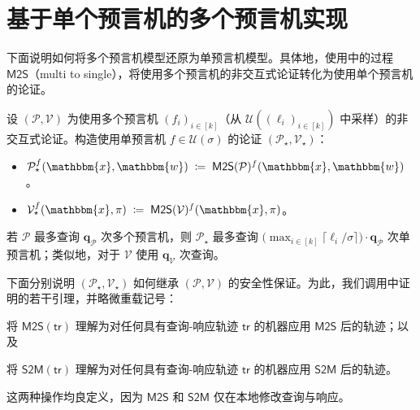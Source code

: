 \documentclass[american,singlepageview]{snargs-book-zh}
\newcommand{\DefineEqual}{\coloneqq}
\newcommand{\Instance}{\mathbbm{x}}
\newcommand{\Witness}{\mathbbm{w}}
\newcommand{\ProtoProver}{P}
\newcommand{\ProtoVerifier}{V}
\newcommand{\ARGFormat}[1]{\mathcal{#1}}
\newcommand{\ARGProver}{\ARGFormat{\ProtoProver}}
\newcommand{\ARGVerifier}{\ARGFormat{\ProtoVerifier}}
\newcommand{\ARGString}{\pi}
\newcommand{\ARGComplexityFormat}[1]{\mathbf{#1}}
\newcommand{\ARGQueryP}{\ARGComplexityFormat{q}_{\scriptscriptstyle\ARGProver}}
\newcommand{\ARGQueryV}{\ARGComplexityFormat{q}_{\scriptscriptstyle\ARGVerifier}}
\newcommand{\ROFunction}{f}
\newcommand{\RODistribution}[1]{\mathcal{U}(#1)}
\newcommand{\ROVectorLength}{k}
\newcommand{\ROTrace}{\mathsf{tr}}
\newcommand{\ROOutputSize}{\sigma}
\newcommand{\ROChosenOutputSize}{\ell}
\newcommand{\MultiToSingle}{\mathsf{M2S}}
\newcommand{\SingleToMulti}{\mathsf{S2M}}
\begin{document}
\section{基于单个预言机的多个预言机实现}
\label{section:narg-multiple-oracles-from-single-oracle}

下面说明如何将多个预言机模型还原为单预言机模型。具体地，使用中的过程 $\MultiToSingle$（multi to single），将使用多个预言机的非交互式论证转化为使用单个预言机的论证。

\begin{construction}
\label{construction:arg-multi-to-single-oracle}
设 $(\ARGProver,\ARGVerifier)$ 为使用多个预言机 $(\ROFunction_{i})_{i\in[\ROVectorLength]}$（从 $\RODistribution{(\ROChosenOutputSize_{i})_{i\in[\ROVectorLength]}}$ 中采样）的非交互式论证。构造使用单预言机 $\ROFunction\in\RODistribution{\ROOutputSize}$ 的论证 $(\ARGProver_{\star},\ARGVerifier_{\star})$：
\begin{itemize}[noitemsep]
  \item $\ARGProver_{\star}^{\ROFunction}(\Instance,\Witness)\;\DefineEqual\;\MultiToSingle(\ARGProver)^{\ROFunction}(\Instance,\Witness)$。
  \item $\ARGVerifier_{\star}^{\ROFunction}(\Instance,\ARGString)\;\DefineEqual\;\MultiToSingle(\ARGVerifier)^{\ROFunction}(\Instance,\ARGString)$。
\end{itemize}
若 $\ARGProver$ 最多查询 $\ARGQueryP$ 次多个预言机，则 $\ARGProver_{\star}$ 最多查询
\(
  \bigl(\max_{i\in[\ROVectorLength]}\lceil\ROChosenOutputSize_{i}/\ROOutputSize\rceil\bigr)
  \cdot\ARGQueryP
\)
次单预言机；类似地，对于 $\ARGVerifier$ 使用 $\ARGQueryV$ 次查询。
\end{construction}

下面分别说明 $(\ARGProver_{\star},\ARGVerifier_{\star})$ 如何继承 $(\ARGProver,\ARGVerifier)$ 的安全性保证。为此，我们调用中证明的若干引理，并略微重载记号：
\begin{inparaenum}[(a)]
  \item 将 $\MultiToSingle(\ROTrace)$ 理解为对任何具有查询-响应轨迹 $\ROTrace$ 的机器应用 $\MultiToSingle$ 后的轨迹；以及
  \item 将 $\SingleToMulti(\ROTrace)$ 理解为对任何具有查询-响应轨迹 $\ROTrace$ 的机器应用 $\SingleToMulti$ 后的轨迹。
\end{inparaenum}
这两种操作均良定义，因为 $\MultiToSingle$ 和 $\SingleToMulti$ 仅在本地修改查询与响应。
\end{document}
